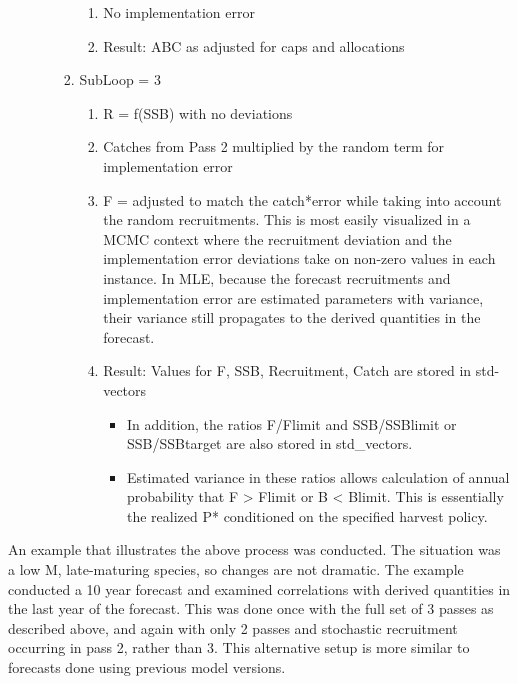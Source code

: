 \begin{enumerate}
\begin{enumerate}
\begin{enumerate}
\begin{enumerate}
				\item No implementation error
				\item Result: ABC as adjusted for caps and allocations
			\end{enumerate}
			\item SubLoop = 3
			\begin{enumerate}
				\item R = f(SSB) with no deviations
				\item Catches from Pass 2 multiplied by the random term for implementation error
				\item F = adjusted to match the catch*error while taking into account the random recruitments. This is most easily visualized in a MCMC context where the recruitment deviation and the implementation error deviations take on non-zero values in each instance. In MLE, because the forecast recruitments and implementation error are estimated parameters with variance, their variance still propagates to the derived quantities in the forecast.
				\item Result: Values for F, SSB, Recruitment, Catch are stored in std-vectors
				\begin{itemize}
					\item In addition, the ratios F/Flimit and SSB/SSBlimit or SSB/SSBtarget are also stored in std\_vectors.
					\item Estimated variance in these ratios allows calculation of annual probability that F > Flimit or B < Blimit. This is essentially the realized P* conditioned on the specified harvest policy.
				\end{itemize}
			\end{enumerate}
		\end{enumerate}
	\end{enumerate}
\end{enumerate}

An example that illustrates the above process was conducted. The situation was a low M, late-maturing species, so changes are not dramatic. The example conducted a 10 year forecast and examined correlations with derived quantities in the last year of the forecast. This was done once with the full set of 3 passes as described above, and again with only 2 passes and stochastic recruitment occurring in pass 2, rather than 3. This alternative setup is more similar to forecasts done using previous model versions.

